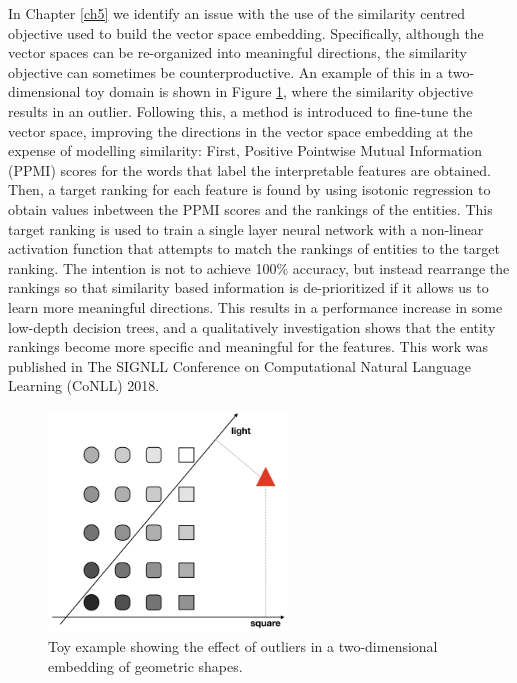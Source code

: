In Chapter \ref{ch5} we identify an issue with the use of the similarity centred objective used to build the vector space embedding. Specifically, although the vector spaces can be re-organized into meaningful directions, the similarity objective can sometimes be counterproductive. An example of this in a two-dimensional toy domain is shown in Figure \ref{ch1:toyExample}, where the similarity objective results in an outlier. Following this, a method is introduced to fine-tune the vector space, improving the directions in the vector space embedding at the expense of modelling similarity: First, Positive Pointwise Mutual Information (PPMI) scores for the words that label the interpretable features are obtained. Then, a target ranking for each feature is found by using isotonic regression to obtain values inbetween the PPMI scores and the rankings of the entities. This target ranking is used to train a single layer neural network with a non-linear activation function that attempts to match the rankings of entities to the target ranking. The intention is not to achieve 100\% accuracy, but instead rearrange the rankings so that similarity based information is de-prioritized if it allows us to learn more meaningful directions. This results in a performance increase in some low-depth decision trees,  and a qualitatively investigation shows that the entity rankings become more specific and meaningful for the features. This work was published in The SIGNLL Conference on Computational Natural Language Learning (CoNLL) 2018.

\begin{figure}
	\centering
	\includegraphics[width=180pt]{images/shapes}
	\caption{Toy example showing the effect of outliers in a two-dimensional embedding of geometric shapes.}
	\label{ch1:toyExample}
\end{figure}


